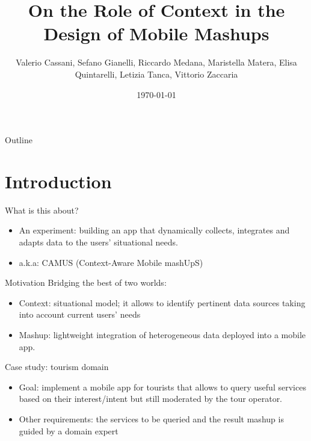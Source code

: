 \documentclass[smaller]{beamer}
\author{Valerio Cassani, Sefano Gianelli, Riccardo Medana, Maristella Matera, Elisa Quintarelli, Letizia Tanca, Vittorio Zaccaria}
\date{\today}
\title{On the Role of Context in the Design of Mobile Mashups}
\begin{document}
\maketitle
\begin{frame}{Outline}
\tableofcontents
\end{frame}


\section{Introduction}
\label{sec:orgheadline4}
\begin{frame}[label={sec:orgheadline1}]{What is this about?}
\begin{itemize}
\item \alert{An experiment}: building an app that dynamically collects, integrates and adapts data to the users’ situational needs.

\item a.k.a: \alert{CAMUS} (Context-Aware Mobile mashUpS)
\end{itemize}
\end{frame}

\begin{frame}[label={sec:orgheadline2}]{Motivation}
Bridging the best of two worlds:

\begin{itemize}
\item \alert{Context}: situational model; it allows to  
identify pertinent data sources taking into account current users’ needs

\item \alert{Mashup}: lightweight integration of heterogeneous data deployed into a mobile
app.
\end{itemize}
\end{frame}

\begin{frame}[label={sec:orgheadline3}]{Case study: tourism domain}
\begin{itemize}
\item \alert{Goal}: implement a mobile app for tourists that allows to query useful
services based on their interest/intent but still moderated by the tour operator.

\item \alert{Other requirements}: the services to be queried and the result mashup is guided by a
domain expert
\end{itemize}
\end{frame}
\end{document}
